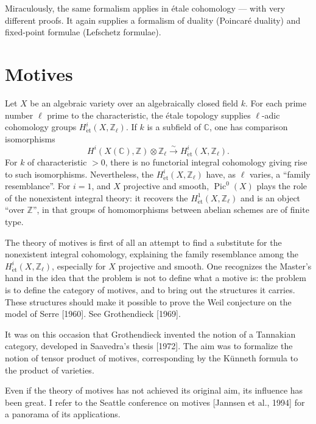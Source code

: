 \documentclass[11pt]{article}
\begin{document}
Miraculously, the same formalism applies in étale cohomology — with very different proofs. It again supplies a formalism of duality (Poincaré duality) and fixed-point formulae (Lefschetz formulae).

\section{Motives}

Let \(X\) be an algebraic variety over an algebraically closed field \(k\). For each prime number \(\ell\) prime to the characteristic, the étale topology supplies \(\ell\)-adic cohomology groups \(H^i_{\mathrm{\acute et}}(X,\mathbb Z_\ell)\). If \(k\) is a subfield of \(\mathbb C\), one has comparison isomorphisms
\[
  H^i(X(\mathbb C),\mathbb Z)\otimes\mathbb Z_\ell
  \xrightarrow{\sim}
  H^i_{\mathrm{\acute et}}(X,\mathbb Z_\ell).
\]
For \(k\) of characteristic \(>0\), there is no functorial integral cohomology giving rise to such isomorphisms. Nevertheless, the \(H^i_{\mathrm{\acute et}}(X,\mathbb Z_\ell)\) have, as \(\ell\) varies, a ``family resemblance''. For \(i=1\), and \(X\) projective and smooth, \(\operatorname{Pic}^0(X)\) plays the role of the nonexistent integral theory: it recovers the \(H^1_{\mathrm{\acute et}}(X,\mathbb Z_\ell)\) and is an object ``over \(\mathbb Z\)'', in that groups of homomorphisms between abelian schemes are of finite type.

The theory of motives is first of all an attempt to find a substitute for the nonexistent integral cohomology, explaining the family resemblance among the \(H^i_{\mathrm{\acute et}}(X,\mathbb Z_\ell)\), especially for \(X\) projective and smooth. One recognizes the Master's hand in the idea that the problem is not to define what a motive is: the problem is to define the category of motives, and to bring out the structures it carries. These structures should make it possible to prove the Weil conjecture on the model of Serre [1960]. See Grothendieck [1969].

It was on this occasion that Grothendieck invented the notion of a Tannakian category, developed in Saavedra's thesis [1972]. The aim was to formalize the notion of tensor product of motives, corresponding by the Künneth formula to the product of varieties.

Even if the theory of motives has not achieved its original aim, its influence has been great. I refer to the Seattle conference on motives [Jannsen et al., 1994] for a panorama of its applications.
\end{document}
